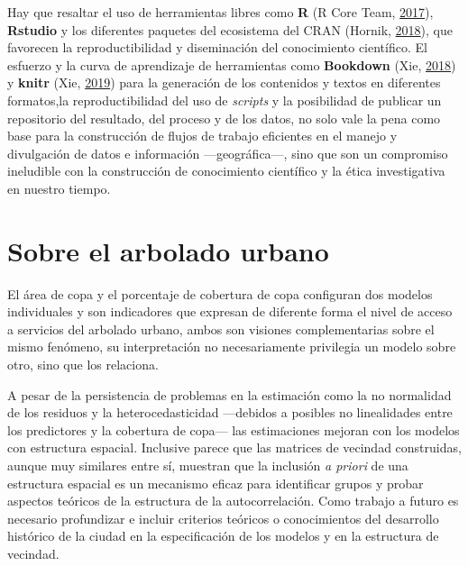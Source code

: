 \documentclass[12pt,a4paper,openany]{book}
\theoremstyle{definition}
\theoremstyle{definition}
\theoremstyle{definition}
\theoremstyle{remark}
\begin{document}
Hay que resaltar el uso de herramientas libres como \textbf{R} (R Core
Team, \protect\hyperlink{ref-R-base}{2017}), \textbf{Rstudio} y los
diferentes paquetes del ecosistema del CRAN (Hornik,
\protect\hyperlink{ref-R-cran}{2018}), que favorecen la
reproductibilidad y diseminación del conocimiento científico. El
esfuerzo y la curva de aprendizaje de herramientas como
\textbf{Bookdown} (Xie, \protect\hyperlink{ref-R-bookdown}{2018}) y
\textbf{knitr} (Xie, \protect\hyperlink{ref-R-knitr}{2019}) para la
generación de los contenidos y textos en diferentes formatos,la
reproductibilidad del uso de \emph{scripts} y la posibilidad de publicar
un repositorio del resultado, del proceso y de los datos, no solo vale
la pena como base para la construcción de flujos de trabajo eficientes
en el manejo y divulgación de datos e información ---geográfica---, sino
que son un compromiso ineludible con la construcción de conocimiento
científico y la ética investigativa en nuestro tiempo.

\section{Sobre el arbolado urbano}\label{sobre-el-arbolado-urbano}

El área de copa y el porcentaje de cobertura de copa configuran dos
modelos individuales y son indicadores que expresan de diferente forma
el nivel de acceso a servicios del arbolado urbano, ambos son visiones
complementarias sobre el mismo fenómeno, su interpretación no
necesariamente privilegia un modelo sobre otro, sino que los relaciona.

A pesar de la persistencia de problemas en la estimación como la no
normalidad de los residuos y la heterocedasticidad ---debidos a posibles
no linealidades entre los predictores y la cobertura de copa--- las
estimaciones mejoran con los modelos con estructura espacial. Inclusive
parece que las matrices de vecindad construidas, aunque muy similares
entre sí, muestran que la inclusión \emph{a priori} de una estructura
espacial es un mecanismo eficaz para identificar grupos y probar
aspectos teóricos de la estructura de la autocorrelación. Como trabajo a
futuro es necesario profundizar e incluir criterios teóricos o
conocimientos del desarrollo histórico de la ciudad en la especificación
de los modelos y en la estructura de vecindad.
\end{document}
